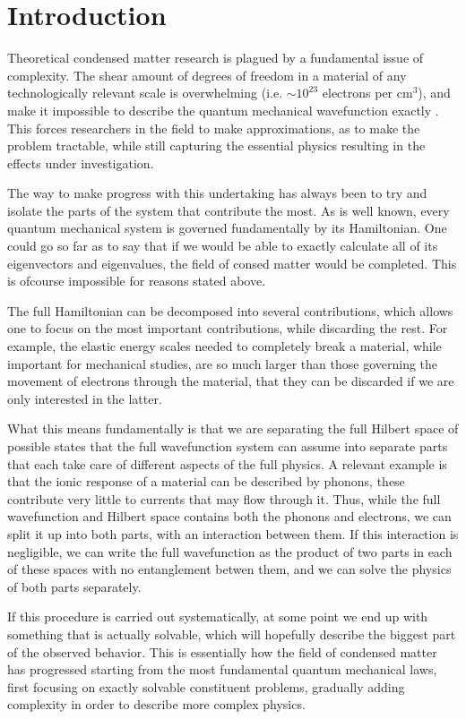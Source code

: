 \chapter{Introduction}
Theoretical condensed matter research is plagued by a fundamental issue of complexity. The shear amount of degrees of freedom in a material of any technologically relevant scale is overwhelming (i.e. $\sim10^{23}$ electrons per cm$^3$), and make it impossible to describe the quantum mechanical wavefunction exactly . This forces researchers in the field to make approximations, as to make the problem tractable, while still capturing the essential physics resulting in the effects under investigation.

The way to make progress with this undertaking has always been to try and isolate the parts of the system that contribute the most. As is well known, every quantum mechanical system is governed fundamentally by its Hamiltonian. One could go so far as to say that if we would be able to exactly calculate all of its eigenvectors and eigenvalues, the field of consed matter would be completed. This is ofcourse impossible for reasons stated above.

The full Hamiltonian can be decomposed into several contributions, which allows one to focus on the most important contributions, while discarding the rest. For example, the elastic energy scales needed to completely break a material, while important for mechanical studies, are so much larger than those governing the movement of electrons through the material, that they can be discarded if we are only interested in the latter.

What this means fundamentally is that we are separating the full Hilbert space of possible states that the full wavefunction system can assume into separate parts that each take care of different aspects of the full physics. A relevant example is that the ionic response of a material can be described by phonons, these contribute very little to currents that may flow through it. Thus, while the full wavefunction and Hilbert space contains both the phonons and electrons, we can split it up into both parts, with an interaction between them. If this interaction is negligible, we can write the full wavefunction as the product of two parts in each of these spaces with no entanglement betwen them, and we can solve the physics of both parts separately.

If this procedure is carried out systematically, at some point we end up with something that is actually solvable, which will hopefully describe the biggest part of the observed behavior. This is essentially how the field of condensed matter has progressed starting from the most fundamental quantum mechanical laws, first focusing on exactly solvable constituent problems, gradually adding complexity in order to describe more complex physics.

